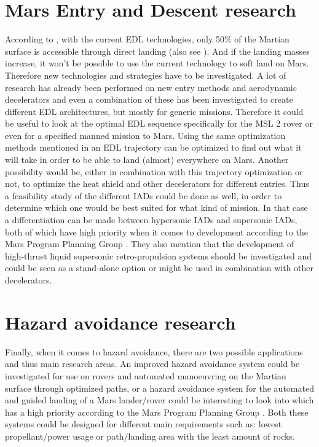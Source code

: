 \section{Mars Entry and Descent research}
\label{sec:medlreop}
According to \cite{sostaric2010}, with the current \ac{EDL} technologies, only 50$\%$ of the Martian surface is accessible through direct landing (also see ). And if the landing masses increase, it won't be possible to use the current technology to soft land on Mars. Therefore new technologies and strategies have to be investigated. A lot of research has already been performed on new entry methods and aerodynamic decelerators and even a combination of these has been investigated to create different \ac{EDL} architectures, but mostly for generic missions. Therefore it could be useful to look at the optimal \ac{EDL} sequence specifically for the \ac{MSL} 2 rover or even for a specified manned mission to Mars. Using the same optimization methods mentioned in  an \ac{EDL} trajectory can be optimized to find out what it will take in order to be able to land (almost) everywhere on Mars. Another possibility would be, either in combination with this trajectory optimization or not, to optimize the heat shield and other decelerators for different entries. Thus a feasibility study of the different \acs{IAD}s could be done as well, in order to determine which one would be best suited for what kind of mission. In that case a differentiation can be made between hypersonic \acs{IAD}s and supersonic \acs{IAD}s, both of which have high priority when it comes to development according to the Mars Program Planning Group \cite{mppg2012}. They also mention that the development of high-thrust liquid supersonic retro-propulsion systems should be investigated and could be seen as a stand-alone option or might be used in combination with other decelerators.    

\section{Hazard avoidance research}
\label{sec:hazavreop}
Finally, when it comes to hazard avoidance, there are two possible applications and thus main research areas. An improved hazard avoidance system could be investigated for use on rovers and automated manoeuvring on the Martian surface through optimized paths, or a hazard avoidance system for the automated and guided landing of a Mars lander/rover could be interesting to look into which has a high priority according to the Mars Program Planning Group \cite{mppg2012}. Both these systems could be designed for different main requirements such as: lowest propellant/power usage or path/landing area with the least amount of rocks. 
